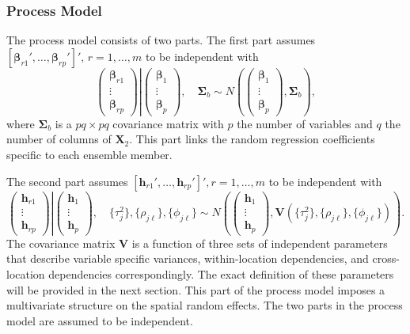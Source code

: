 \documentclass{article}
\begin{document}
\subsubsection{Process Model}
The process model consists of two parts. The first part assumes $[\boldsymbol{\beta}_{r1}',\dots,\boldsymbol{\beta}_{rp}']', \, r = 1, \dots, m$ to be independent with
$$  \left .
    \begin{pmatrix}
        \boldsymbol{\beta}_{r1} \\
        \vdots \\
        \boldsymbol{\beta}_{rp}
    \end{pmatrix}  \right \vert
    \begin{pmatrix}
        \boldsymbol{\beta}_{1} \\
        \vdots \\
        \boldsymbol{\beta}_{p}
    \end{pmatrix}, \quad \boldsymbol{\Sigma}_b \sim N \left(   
        \begin{pmatrix}
            \boldsymbol{\beta}_{1} \\
            \vdots \\
            \boldsymbol{\beta}_{p}
        \end{pmatrix}, \boldsymbol{\Sigma}_b
    \right),
$$
where $\boldsymbol{\Sigma}_b$ is a $pq \times pq$ covariance matrix with $p$ the number of variables and $q$ the number of columns of $\boldsymbol{X}_2$. This part links the random regression coefficients specific to each ensemble member.

The second part assumes $[\boldsymbol{h}_{r1}', \dots, \boldsymbol{h}_{rp}']', r = 1, \dots, m$ to be independent with 
$$
    \left .
    \begin{pmatrix}
        \boldsymbol{h}_{r1} \\
        \vdots \\
        \boldsymbol{h}_{rp}
    \end{pmatrix}  \right \vert
    \begin{pmatrix}
        \boldsymbol{h}_{1} \\
        \vdots \\
        \boldsymbol{h}_{p}
    \end{pmatrix}, \quad \{\tau_j^2\}, \{\rho_{j\ell}\}, \{\phi_{j\ell}\} \sim N \left(   
        \begin{pmatrix}
            \boldsymbol{h}_{1} \\
            \vdots \\
            \boldsymbol{h}_{p}
        \end{pmatrix}, \boldsymbol{V}(\{\tau_j^2\}, \{\rho_{j\ell}\}, \{\phi_{j\ell}\})
    \right).
$$
The covariance matrix $\boldsymbol{V}$ is a function of three sets of independent parameters that describe variable specific variances, within-location dependencies, and cross-location dependencies correspondingly. The exact definition of these parameters will be provided in the next section. This part of the process model imposes a multivariate structure on the spatial random effects. The two parts in the process model are assumed to be independent. 
\end{document}
